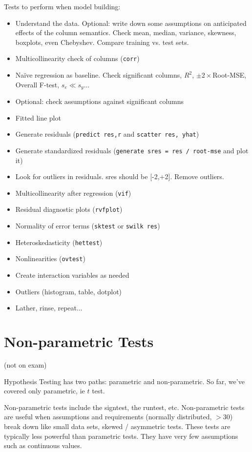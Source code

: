 \documentclass[11pt, oneside]{article}   	%
\begin{document}
Tests to perform when model building:
\begin{itemize}
\item{Understand the data. Optional: write down some assumptions on anticipated effects of the column semantics. Check mean, median, variance, skewness, boxplots, even Chebyshev. Compare training vs. test sets.}
\item{Multicollinearity check of columns (\texttt{corr})}
\item{Na{\"i}ve regression as baseline. Check significant columns, $R^2$, $\pm2 \times $Root-MSE, Overall F-test, $s_e \ll s_y$... }
\item{Optional: check assumptions against significant columns}
\item{Fitted line plot}
\item{Generate residuals (\texttt{predict res,r} and \texttt{scatter res, yhat})}
\item{Generate standardized residuals (\texttt{generate sres = res / root-mse} and plot it)}
\item{Look for outliers in residuals. sres should be [-2,+2]. Remove outliers.}
\item{Multicollinearity after regression (\texttt{vif})}
\item{Residual diagnostic plots (\texttt{rvfplot})}
\item{Normality of error terms (\texttt{sktest} or \texttt{swilk res})}
\item{Heteroskedasticity (\texttt{hettest})}
\item{Nonlinearities (\texttt{ovtest})}
\item{Create interaction variables as needed}
\item{Outliers (histogram, table, dotplot)}
\item{Lather, rinse, repeat...}
\end{itemize}

\section{Non-parametric Tests}
(not on exam)

Hypothesis Testing has two paths: parametric and non-parametric. So far, we've covered only parametric, ie $t$ test. 

Non-parametric tests include the signtest, the runtest, etc. Non-parametric tests are useful when assumptions and requirements (normally distributed, $> 30$) break down like small data sets, skewed / asymmetric tests. These tests are typically less powerful than parametric tests. They have very few assumptions such as continuous values.
\end{document}

